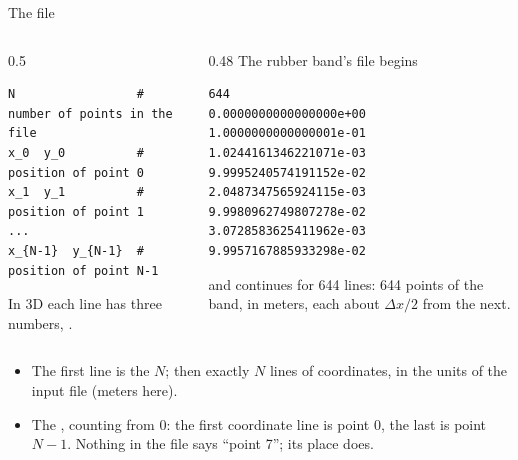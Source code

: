 \documentclass[aspectratio=169,11pt]{beamer}
\begin{document}
\begin{frame}[fragile]{The  file}
\begin{columns}[T,onlytextwidth]
\begin{column}{0.5\textwidth}
\begin{lstlisting}[style=data]
N                 # number of points in the file
x_0  y_0          # position of point 0
x_1  y_1          # position of point 1
...
x_{N-1}  y_{N-1}  # position of point N-1
\end{lstlisting}
\small In 3D each line has three numbers, .
\end{column}
\begin{column}{0.48\textwidth}
\small The rubber band's file begins
\begin{lstlisting}[style=tiny]
644
0.0000000000000000e+00 1.0000000000000001e-01
1.0244161346221071e-03 9.9995240574191152e-02
2.0487347565924115e-03 9.9980962749807278e-02
3.0728583625411962e-03 9.9957167885933298e-02
\end{lstlisting}
and continues for 644 lines: 644 points of the band, in meters, each about $\Delta x/2$ from the next.
\end{column}
\end{columns}
\vspace{2mm}
\begin{itemize}
  \item The first line is the  $N$; then exactly $N$ lines of coordinates, in the units of the input file (meters here).
  \item The , counting from 0: the first coordinate line is point 0, the last is point $N-1$. Nothing in the file says ``point 7''; its place does.
\end{itemize}
\end{frame}
\end{document}
